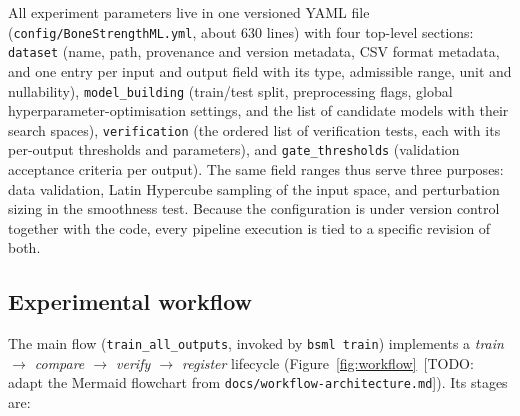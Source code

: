 All experiment parameters live in one versioned YAML file
(\texttt{config/BoneStrengthML.yml}, about 630 lines) with four top-level
sections: \texttt{dataset} (name, path, provenance and version metadata, CSV
format metadata, and one entry per input and output field with its type,
admissible range, unit and nullability), \texttt{model\_building} (train/test
split, preprocessing flags, global hyperparameter-optimisation settings, and
the list of candidate models with their search spaces),
\texttt{verification} (the ordered list of verification tests, each with its
per-output thresholds and parameters), and \texttt{gate\_thresholds}
(validation acceptance criteria per output). The same field ranges thus serve
three purposes: data validation, Latin Hypercube sampling of the input space,
and perturbation sizing in the smoothness test. Because the configuration is
under version control together with the code, every pipeline execution is
tied to a specific revision of both.

\subsection{Experimental workflow}
\label{sec:methods:workflow}

The main flow (\texttt{train\_all\_outputs}, invoked by \texttt{bsml train})
implements a \emph{train $\rightarrow$ compare $\rightarrow$ verify
$\rightarrow$ register} lifecycle (Figure~\ref{fig:workflow}~[TODO: adapt the
Mermaid flowchart from \texttt{docs/workflow-architecture.md}]). Its stages
are:


